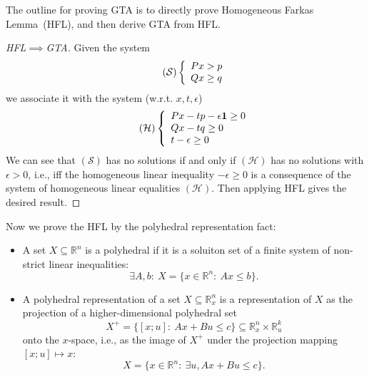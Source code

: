 The outline for proving GTA is to directly prove Homogeneous Farkas Lemma~(HFL), and then derive GTA from HFL.
\begin{proof}[HFL$\implies$GTA]
Given the system
\begin{equation}
\tag{$\mathcal{S}$}
\left\{
\begin{array}{l}
Px>p\\
Qx\ge q
\end{array}
\right.
\end{equation}
we associate it with the system (w.r.t. $x,t,\epsilon$)
\begin{equation}
\tag{$\mathcal{H}$}
\left\{
\begin{array}{l}
Px - tp - \epsilon\bm1\ge0\\
Qx - tq\ge 0\\
t - \epsilon\ge0
\end{array}
\right.
\end{equation}
We can see that $(\mathcal{S})$ has no solutions if and only if $(\mathcal{H})$ has no solutions with $\epsilon>0$, i.e., iff the homogeneous linear inequality $-\epsilon\ge0$ is a consequence of the system of homogeneous linear equalities $(\mathcal{H})$.
Then applying HFL gives the desired result.
\end{proof}
Now we prove the HFL by the polyhedral representation fact:
\begin{definition}
\begin{itemize}
\item
A set $X\subseteq\mathbb{R}^n$ is a polyhedral if it is a soluiton set of a finite system of non-strict linear inequalities:
\[
\exists A,b:~X=\{x\in\mathbb{R}^n:~Ax\le b\}.
\]
\item
A polyhedral representation of a set $X\subseteq\mathbb{R}_x^n$
is a representation of $X$ as the projection of a higher-dimensional polyhedral set
\[
X^+=\{[x;u]:~Ax+Bu\le c\}\subseteq \mathbb{R}_x^n\times\mathbb{R}_u^k
\]
onto the $x$-space, i.e., as the image of $X^+$ under the projection mapping 
$[x;u]\mapsto x$:
\[
X=\{x\in\mathbb{R}^n:~\exists u, Ax+Bu\le c\}.
\]
\end{itemize}
\end{definition}

